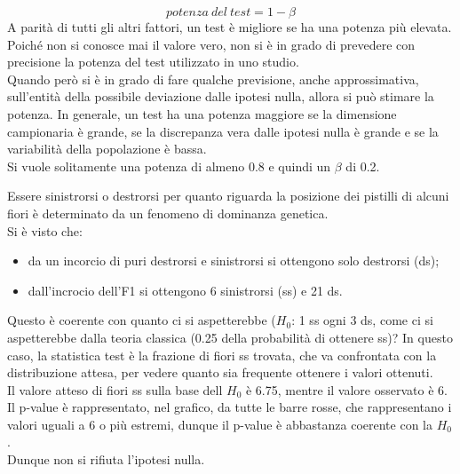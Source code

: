 \documentclass[drafts, 10pt]{book}
\newcounter{example}[section]
\begin{document}
\begin{equation}
    potenza\ del\ test = 1-\beta
\end{equation}
A parità di tutti gli altri fattori, un test è migliore se ha una potenza più elevata.
\\
Poiché non si conosce mai il valore vero, non si è in grado di prevedere con precisione la potenza del test utilizzato in uno studio. 
\\
Quando però si è in grado di fare qualche previsione, anche approssimativa, sull'entità della possibile deviazione dalle ipotesi nulla, allora si può stimare la potenza. In generale, un test ha una potenza maggiore se la dimensione campionaria è grande, se la discrepanza vera dalle ipotesi nulla è grande e se la variabilità della popolazione è bassa.
\\
Si vuole solitamente una potenza di almeno 0.8 e quindi un $\beta$ di 0.2.
\begin{example}
    Essere sinistrorsi o destrorsi per quanto riguarda la posizione dei pistilli di alcuni fiori è determinato da un fenomeno di dominanza genetica.
    \\
    Si è visto che:
    \begin{itemize}
        \item da un incorcio di puri destrorsi e sinistrorsi si ottengono solo destrorsi (ds);
        \item dall’incrocio dell’F1 si ottengono 6 sinistrorsi (ss) e 21 ds.
    \end{itemize}
    Questo è coerente con quanto ci si aspetterebbe ($H_0$: 1 ss ogni 3 ds, come ci si aspetterebbe dalla teoria classica (0.25 della probabilità di ottenere ss)?
In questo caso, la statistica test è la frazione di fiori ss trovata, che va confrontata con la distribuzione attesa, per vedere quanto sia frequente ottenere i valori ottenuti.
\\
Il valore atteso di fiori ss sulla base dell $H_0$ è 6.75, mentre il valore osservato è 6.
\\
Il p-value è rappresentato, nel grafico, da tutte le barre rosse, che rappresentano i valori uguali a 6 o più estremi, dunque il p-value è abbastanza coerente con la $H_0$.
\\
Dunque non si rifiuta l'ipotesi nulla.
\end{example}
\end{document}
